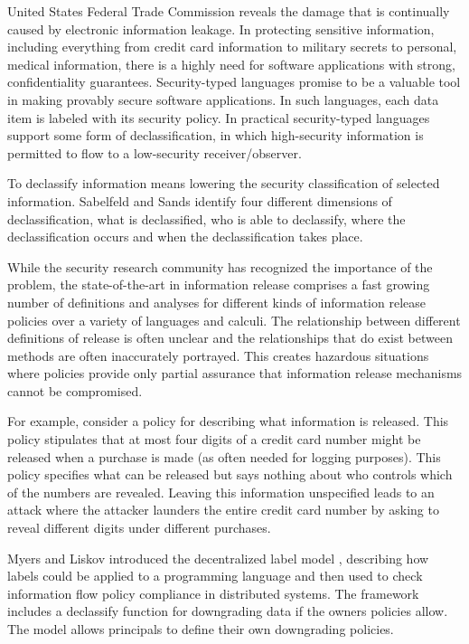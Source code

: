 United States Federal Trade Commission reveals the damage that is continually caused by electronic information leakage. In protecting sensitive information, including everything from credit card information to military secrets to personal, medical information, there is a highly
need for software applications with strong, confidentiality guarantees.
Security-typed languages promise to be a valuable tool in making provably secure software applications. In such languages, each
data item is labeled with its security policy. In practical security-typed languages support some form of declassification, in which high-security information is permitted to flow to a low-security receiver/observer.

To declassify information means lowering the security classification of selected information. Sabelfeld and Sands \cite{ref_3_sabelfeld2009declassification} identify four different dimensions of declassification, what is declassified, who is able to declassify, where the declassification occurs and when the declassification takes place.

While the security research community has recognized the importance of the problem, the state-of-the-art in information release comprises a fast growing number of definitions and analyses for different kinds of information release policies over a variety of languages and calculi. The relationship between different definitions of release is often unclear and the relationships that do exist between methods are
often inaccurately portrayed. This creates hazardous situations where policies provide only partial assurance that information release mechanisms cannot be compromised.

For example, consider a policy for describing what information is released. This policy stipulates that at most four digits of a credit card number might be released when a purchase is made (as often needed for logging purposes). This policy specifies what can be released but says nothing about who controls which of the numbers are revealed.
Leaving this information unspecified leads to an attack where the attacker launders the entire credit card number by asking to reveal different digits under different purchases.

Myers and Liskov introduced the decentralized label model \cite{ref_4_myers2000protecting}, describing how labels could be applied
to a programming language and then used to check information
flow policy compliance in distributed systems. The framework
includes a declassify function for downgrading data if the
owners policies allow. The model allows principals to define their own downgrading policies.

